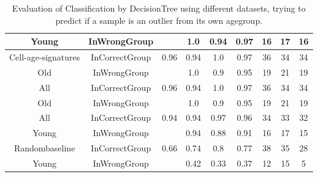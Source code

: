 \begin{table}[H]
\begin{tabular}{|c|c|c|c|c|c|c|c|c|}
		\rowcolor{green!40!yellow!40}
		Young & InWrongGroup &   & 1.0 & 0.94 & 0.97 & 16 & 17 & 16 \\
		\hline
		\rowcolor{green!40!yellow!40}
		Cell-age-signatures & InCorrectGroup & 0.96 & 0.94 & 1.0 & 0.97 & 36 & 34 & 34 \\
		\rowcolor{green!40!yellow!40}
		Old & InWrongGroup &   & 1.0 & 0.9 & 0.95 & 19 & 21 & 19 \\
		\hline
		\hline
		\rowcolor{green!80!yellow!50}
		All & InCorrectGroup & 0.96 & 0.94 & 1.0 & 0.97 & 36 & 34 & 34 \\
		\rowcolor{green!80!yellow!50}
		Old & InWrongGroup &   & 1.0 & 0.9 & 0.95 & 19 & 21 & 19 \\
		\hline
		\rowcolor{green!80!yellow!50}
		All & InCorrectGroup & 0.94 & 0.94 & 0.97 & 0.96 & 34 & 33 & 32 \\
		\rowcolor{green!80!yellow!50}
		Young & InWrongGroup &   & 0.94 & 0.88 & 0.91 & 16 & 17 & 15 \\
		\hline
		\hline
		\rowcolor{green!40!yellow!40}
		Randombaseline & InCorrectGroup & 0.66 & 0.74 & 0.8 & 0.77 & 38 & 35 & 28 \\
		\rowcolor{green!40!yellow!40}
		Young & InWrongGroup &   & 0.42 & 0.33 & 0.37 & 12 & 15 & 5 \\
		\hline
	\end{tabular}
	\caption{Evaluation of Classification by DecisionTree using different datasets, trying to predict if a sample is an outlier from its own agegroup.}
	\label{tab:CompareOutliersClassificationDecisionTree}
\end{table}